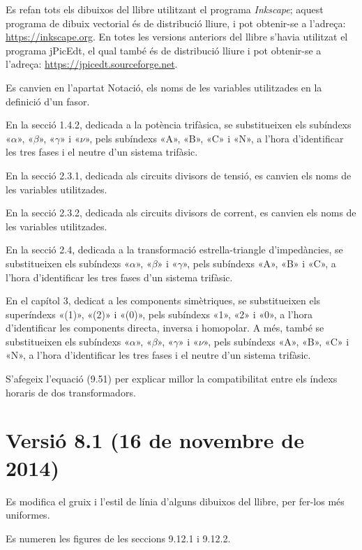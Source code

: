 Es refan tots els dibuixos del llibre utilitzant el programa \emph{Inkscape}; aquest programa de dibuix vectorial és de distribució lliure, i pot obtenir-se a l'adreça: \href{https://inkscape.org/}{https:/\!\!/inkscape.org}. En totes les versions anteriors del llibre s'havia utilitzat el programa jPicEdt, el qual també és de distribució lliure i pot obtenir-se a l'adreça: \href{https://jpicedt.sourceforge.net//}{https:/\!\!/jpicedt.sourceforge.net}.

Es canvien en l'apartat Notació, els noms de les variables utilitzades en la definició d'un fasor.

En la secció 1.4.2, dedicada a la potència trifàsica, se substitueixen els subíndexs «$\alpha$», «$\beta$», «$\gamma$» i «$\nu$», pels subíndexs «A», «B», «C» i «N», a l'hora d'identificar les tres fases  i el neutre d'un sistema trifàsic.

En la secció 2.3.1,  dedicada als circuits divisors de tensió, es canvien els noms de les variables utilitzades.

En la secció 2.3.2,  dedicada als circuits divisors de corrent, es canvien els noms de les variables utilitzades.

En la secció 2.4, dedicada a la transformació estrella-triangle d'impedàncies, se substitueixen els subíndexs «$\alpha$», «$\beta$» i «$\gamma$», pels subíndexs «A», «B» i «C», a l'hora d'identificar les tres fases d'un sistema trifàsic.

En el capítol 3, dedicat a les components simètriques, se substitueixen els superíndexs «(1)», «(2)» i «(0)», pels subíndexs «1», «2» i «0», a l'hora d'identificar les components directa, inversa i homopolar. A més, també se substitueixen els subíndexs «$\alpha$», «$\beta$», «$\gamma$» i «$\nu$», pels subíndexs «A», «B»,  «C» i «N», a l'hora d'identificar les tres fases i el neutre d'un sistema trifàsic.

S'afegeix l'equació (9.51) per explicar millor la compatibilitat entre els índexs horaris de dos transformadors.

\section*{Versió 8.1 (16 de novembre de 2014)}

Es modifica el gruix i l'estil de línia d'alguns dibuixos del llibre, per  fer-los més uniformes.

Es numeren les figures de les seccions 9.12.1 i 9.12.2.


